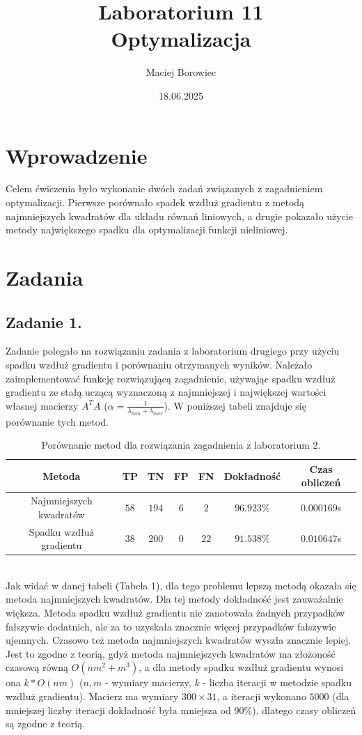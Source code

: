 \documentclass{article}
\title{Laboratorium 11 \\ Optymalizacja}
\author{Maciej Borowiec}
\date{18.06.2025}
\begin{document}
\maketitle

\section{Wprowadzenie}
Celem ćwiczenia było wykonanie dwóch zadań związanych z zagadnieniem optymalizacji. Pierwsze porównało spadek wzdłuż gradientu z metodą najmniejszych kwadratów dla układu równań liniowych, a drugie pokazało użycie metody największego spadku dla optymalizacji funkcji nieliniowej.

\section{Zadania}

\subsection{Zadanie 1.}
Zadanie polegało na rozwiązaniu zadania z laboratorium drugiego przy użyciu spadku wzdłuż gradientu i porównaniu otrzymanych wyników. Należało zaimplementować funkcję rozwiązującą zagadnienie, używając spadku wzdłuż gradientu ze stałą uczącą wyznaczoną z najmniejszej i największej wartości własnej macierzy $A^TA$ ($\alpha = \frac{1}{\lambda_{min} + \lambda_{max}}$). W poniższej tabeli znajduje się porównanie tych metod.
\begin{table}[h!]
    \centering
    \begin{tabular}{|c|c|c|c|c|c|c|}
        \hline
        Metoda & TP & TN & FP & FN & Dokładność & Czas obliczeń \\
        \hline
        Najmniejszych kwadratów & $58$ & $194$ & $6$ & $2$ & $96.923\%$ & $0.000169$s \\
        Spadku wzdłuż gradientu & $38$ & $200$ & $0$ & $22$ & $91.538\%$ & $0.010647$s \\
        \hline
    \end{tabular}
    \caption{Porównanie metod dla rozwiązania zagadnienia z laboratorium 2.}
    \label{table}
\end{table}
\\
Jak widać w danej tabeli (Tabela 1), dla tego problemu lepszą metodą okazała się metoda najmniejszych kwadratów. Dla tej metody dokładność jest zauważalnie większa. Metoda spadku wzdłuż gradientu nie zanotowała żadnych przypadków fałszywie dodatnich, ale za to uzyskała znacznie więcej przypadków fałszywie ujemnych. Czasowo też metoda najmniejszych kwadratów wyszła znacznie lepiej. Jest to zgodne z teorią, gdyż metoda najmniejszych kwadratów ma złożoność czasową równą $O(nm^2 + m^3)$, a dla metody spadku wzdłuż gradientu wynosi ona $k*O(nm)$ ($n,m$ - wymiary macierzy, $k$ - liczba iteracji w metodzie spadku wzdłuż gradientu). Macierz ma wymiary $300\times31$, a iteracji wykonano $5000$ (dla mniejszej liczby iteracji dokładność była mniejsza od 90\%), dlatego czasy obliczeń są zgodne z teorią.
\end{document}
